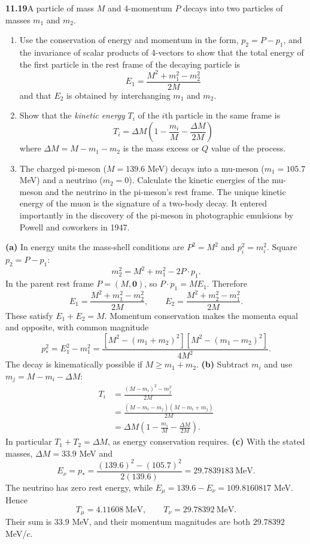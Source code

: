 \par\bigskip
\noindent\textbf{11.19}\quad A particle of mass $M$ and 4-momentum $P$ decays into two particles of masses $m_{1}$ and $m_{2}$.
\begin{enumerate}
\item[(a)] Use the conservation of energy and momentum in the form, $p_{2}=P-p_{1}$, and the invariance of scalar products of 4-vectors to show that the total energy of the first particle in the rest frame of the decaying particle is
\[
E_{1}=\frac{M^{2}+m_{1}^{2}-m_{2}^{2}}{2M}
\]
and that $E_{2}$ is obtained by interchanging $m_{1}$ and $m_{2}$.
\item[(b)] Show that the \emph{kinetic energy} $T_{i}$ of the $i$th particle in the same frame is
\[
T_{i}=\Delta M\!\left(1-\frac{m_{i}}{M}-\frac{\Delta M}{2M}\right)
\]
where $\Delta M=M-m_{1}-m_{2}$ is the mass excess or $Q$ value of the process.
\item[(c)] The charged pi-meson ($M=139.6$ MeV) decays into a mu-meson ($m_{1}=105.7$ MeV) and a neutrino ($m_{2}=0$). Calculate the kinetic energies of the mu-meson and the neutrino in the pi-meson's rest frame. The unique kinetic energy of the muon is the signature of a two-body decay. It entered importantly in the discovery of the pi-meson in photographic emulsions by Powell and coworkers in 1947.
\end{enumerate}
\solution
\textbf{(a)} In energy units the mass-shell conditions are
$P^2=M^2$ and $p_i^2=m_i^2$. Square $p_2=P-p_1$:
\[
m_2^2=M^2+m_1^2-2P\cdot p_1.
\]
In the parent rest frame $P=(M,\mathbf0)$, so
$P\cdot p_1=ME_1$. Therefore
\[
\boxed{E_1=\frac{M^2+m_1^2-m_2^2}{2M},\qquad
E_2=\frac{M^2+m_2^2-m_1^2}{2M}.}
\]
These satisfy $E_1+E_2=M$. Momentum conservation makes the
momenta equal and opposite, with common magnitude
\[
p_*^2=E_1^2-m_1^2
=\frac{[M^2-(m_1+m_2)^2][M^2-(m_1-m_2)^2]}{4M^2}.
\]
The decay is kinematically possible if $M\geq m_1+m_2$.
\textbf{(b)} Subtract $m_i$ and use
$m_j=M-m_i-\Delta M$:
\begin{align*}
T_i&=\frac{(M-m_i)^2-m_j^2}{2M}\\
&=\frac{(M-m_i-m_j)(M-m_i+m_j)}{2M}\\
&=\boxed{\Delta M\left(1-\frac{m_i}{M}-\frac{\Delta M}{2M}\right).}
\end{align*}
In particular $T_1+T_2=\Delta M$, as energy conservation requires.
\textbf{(c)} With the stated masses, $\Delta M=33.9$ MeV and
\[
E_\nu=p_*=
\frac{(139.6)^2-(105.7)^2}{2(139.6)}=29.7839183\ \mathrm{MeV}.
\]
The neutrino has zero rest energy, while
$E_\mu=139.6-E_\nu=109.8160817$ MeV. Hence
\[
\boxed{T_\mu=4.11608\ \mathrm{MeV},\qquad
T_\nu=29.78392\ \mathrm{MeV}.}
\]
Their sum is $33.9$ MeV, and their momentum magnitudes are both
$29.78392$ MeV/$c$.

